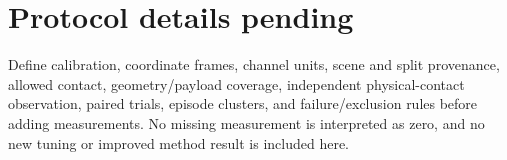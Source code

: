 \section{Protocol details pending}
Define calibration, coordinate frames, channel units, scene and split provenance,
allowed contact, geometry/payload coverage, independent physical-contact observation,
paired trials, episode clusters, and failure/exclusion rules before adding measurements.
No missing measurement is interpreted as zero, and no new tuning or improved
method result is included here.
